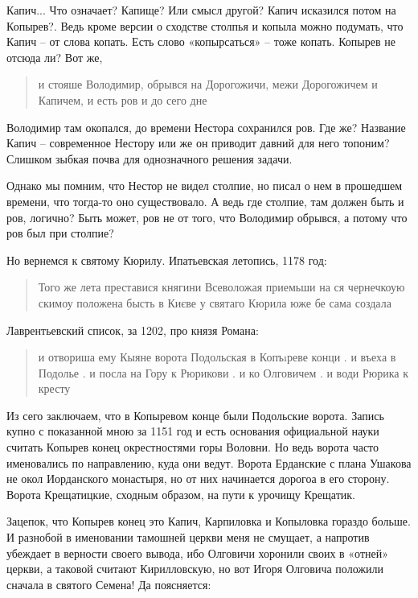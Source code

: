 Капич... Что означает? Капище? Или смысл другой? Капич исказился потом на Копырев?. Ведь кроме версии о сходстве столпья и копыла можно подумать, что Капич – от слова копать. Есть слово «копырсаться» – тоже копать. Копырев не отсюда ли? Вот же,

\begin{quotation}
и стояше Володимир, обрывся на Дорогожичи, межи Дорогожичем и Капичем, и есть ров и до сего дне
\end{quotation}

Володимир там окопался, до времени Нестора сохранился ров. Где же? Название Капич – современное Нестору или же он приводит давний для него топоним? Слишком зыбкая почва для однозначного решения задачи.

Однако мы помним, что Нестор не видел столпие, но писал о нем в прошедшем времени, что тогда-то оно существовало. А ведь где столпие, там должен быть и ров, логично? Быть может, ров не от того, что Володимир обрывся, а потому что ров был при столпие? 

Но вернемся к святому Кюрилу. Ипатьевская летопись, 1178 год:

\begin{quotation}
Того же лета преставися княгини Всеволожая приемьши на ся чернечкоую скимоу положена бысть в Києве у святаго Кюрила юже бе сама создала
\end{quotation}

Лаврентьевский список, за 1202, про князя Романа:

\begin{quotation}
и отвориша ему Кыяне ворота Подольская в Копъıреве конци . и въеха в Подолье . и посла на Гору к Рюрикови . и ко Олговичем . и води Рюрика к кресту
\end{quotation}

Из сего заключаем, что в Копыревом конце были Подольские ворота. Запись купно с показанной мною за 1151 год и есть основания официальной науки считать Копырев конец окрестностями горы Воловни. Но ведь ворота часто именовались по направлению, куда они ведут. Ворота Ерданские с плана Ушакова не окол Иорданского монастыря, но от них начинается дорогоа в его сторону. Ворота Крещатицкие, сходным образом, на пути к урочищу Крещатик. 

Зацепок, что Копырев конец это Капич, Карпиловка и Копыловка гораздо больше. И разнобой в именовании тамошней церкви меня не смущает, а напротив убеждает в верности своего вывода, ибо Олговичи хоронили своих в «отней» церкви, а таковой считают Кирилловскую, но вот Игоря Олговича положили сначала в святого Семена! Да поясняется:

